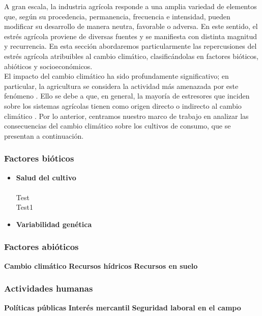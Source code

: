 A gran escala, la industria agrícola responde a una amplia variedad de elementos que, según su procedencia, permanencia, frecuencia e intensidad, pueden modificar su desarrollo de manera neutra, favorable o adversa. En este sentido, el estrés agrícola proviene de diversas fuentes y se manifiesta con distinta magnitud y recurrencia. En esta sección abordaremos particularmente las repercusiones del estrés agrícola atribuibles al cambio climático, clasificándolas en factores bióticos, abióticos y socioeconómicos.\\

El impacto del cambio climático ha sido profundamente significativo; en particular, la agricultura se considera la actividad más amenazada por este fenómeno \cite{Boyer_1982, Raza_2019}. Ello se debe a que, en general, la mayoría de estresores que inciden sobre los sistemas agrícolas tienen como origen directo o indirecto al cambio climático \cite{Olschewski_2024, Raza_2019, Surowka_2020}. Por lo anterior, centramos nuestro marco de trabajo en analizar las consecuencias del cambio climático sobre los cultivos de consumo, que se presentan a continuación.


\subsubsection{Factores bióticos}
\begin{itemize}[leftmargin=0cm, itemsep=0.5 cm]
	\item[]\textbf{Salud del cultivo\\}\\
	{Test\\ 
		
	Test1 }
	\item[]\textbf{Variabilidad genética}
\end{itemize}


\subsubsection{Factores abióticos}
\textbf{Cambio climático}
\textbf{Recursos hídricos}
\textbf{Recursos en suelo}

\subsubsection{Actividades humanas}
\textbf{Políticas públicas}
\textbf{Interés mercantil}
\textbf{Seguridad laboral en el campo}
